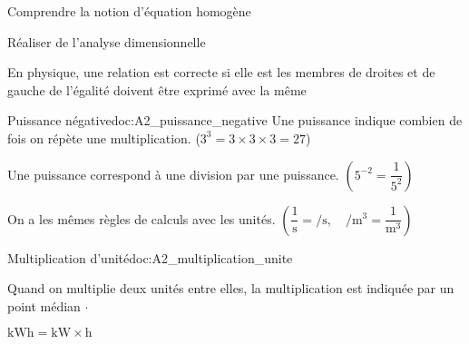\teteTermStssMeth

\vspace*{-36pt}

\begin{objectifs}
  \item Comprendre la notion d'équation homogène
  \item Réaliser de l'analyse dimensionnelle
\end{objectifs}

\begin{contexte}
  En physique, une relation est correcte si elle est  les membres de droites et de gauche de l'égalité doivent être exprimé avec la même 

\end{contexte}

\vspace*{-8pt}
\vspace*{-8pt}

\begin{doc}{Puissance négative}{doc:A2_puissance_negative}
  Une puissance indique combien de fois on répète une multiplication.
  ($3^3 = 3\times 3 \times 3 = 27$)

  Une puissance  correspond à une division par une puissance.
  $\left(5^{-2} = \dfrac{1}{5^2}\right)$

  \begin{importants}
    On a les mêmes règles de calculs avec les unités.
    $\left(\dfrac{1}{\unit{\s}} = \unit{\per\s}, \quad
    \unit{\per\m\cubed} = \dfrac{1}{\unit{\m\cubed}}\right)$
  \end{importants}
\end{doc}

\begin{doc}{Multiplication d'unité}{doc:A2_multiplication_unite}
  \begin{importants}
    Quand on multiplie deux unités entre elles, la multiplication est indiquée par un point médian $\cdot$
    
    \exemple $\unit{\kilo\watt\hour} = \unit{\kilo\watt}\times\unit{\hour}$
  \end{importants}
\end{doc}


